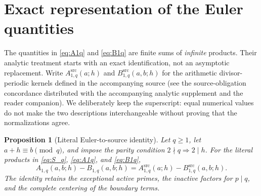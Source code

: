 \documentclass[11pt]{article}
\newtheorem{proposition}[theorem]{Proposition}
\theoremstyle{definition}
\theoremstyle{remark}
\newcommand{\1}{\mathbf 1}
\begin{document}
\section{Exact representation of the Euler quantities}\label{sec:euler-bridge}

The quantities in \eqref{eq:A1q} and \eqref{eq:B1q} are finite sums of
\emph{infinite} products. Their analytic treatment starts with an exact
identification, not an asymptotic replacement. Write
$A^{\mathrm{src}}_{1,q}(a;h)$ and $B^{\mathrm{src}}_{1,q}(a,b;h)$ for the
arithmetic divisor-periodic kernels defined in the accompanying source
(see the source-obligation concordance distributed with the accompanying analytic supplement and the reader companion). We deliberately keep the
superscript: equal numerical values do not make the two descriptions
interchangeable without proving that the normalizations agree.

\begin{proposition}[Literal Euler-to-source identity]\label{prop:euler-bridge}
Let $q\ge1$, let $a+h\equiv b\pmod q$, and impose the parity condition
$2\nmid q\Rightarrow2\mid h$. For the literal products in
\eqref{eq:S_q}, \eqref{eq:A1q}, and \eqref{eq:B1q},
\begin{equation}\label{eq:euler-source-bridge}
 A_{1,q}(a,b;h)-B_{1,q}(a,b;h)
 =A^{\mathrm{src}}_{1,q}(a;h)-B^{\mathrm{src}}_{1,q}(a,b;h).
\end{equation}
The identity retains the exceptional active primes, the inactive factors
for $p\mid q$, and the complete centering of the boundary terms.
\end{proposition}
\end{document}
